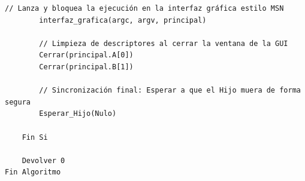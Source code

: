 \begin{lstlisting}[style=estiloPseudo]
        // Lanza y bloquea la ejecución en la interfaz gráfica estilo MSN
        interfaz_grafica(argc, argv, principal)

        // Limpieza de descriptores al cerrar la ventana de la GUI
        Cerrar(principal.A[0])
        Cerrar(principal.B[1])

        // Sincronización final: Esperar a que el Hijo muera de forma segura
        Esperar_Hijo(Nulo)
        
    Fin Si

    Devolver 0
Fin Algoritmo
\end{lstlisting}